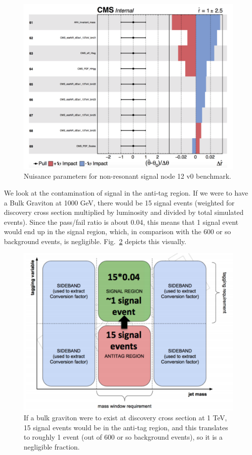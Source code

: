 \begin{figure}[thb!]
\begin{center}
\includegraphics[scale=0.5]{Figures/nuisance3.pdf}
\end{center}
\caption{Nuisance parameters for non-resonant signal node 12 v0 benchmark.}
\label{fig:nuisance3}
\end{figure}

We look at the contamination of signal in the anti-tag region. If we were to have a Bulk Graviton at 1000 GeV, there would be 15 signal events (weighted for discovery cross section multiplied by luminosity and divided by total simulated events). Since the pass/fail ratio is about 0.04, this means that 1 signal event would end up in the signal region, which, in comparison with the 600 or so background events, is negligible. Fig.~\ref{fig:sigAT} depicts this visually.
\begin{figure}[thb!]
\begin{center}
\includegraphics[scale=0.5]{Figures/signalAT.pdf}
\end{center}
\caption{If a bulk graviton were to exist at discovery cross section at 1 TeV, 15 signal events would be in the anti-tag region, and this translates to roughly 1 event (out of 600 or so background events), so it is a negligible fraction.}
\label{fig:sigAT}
\end{figure}

